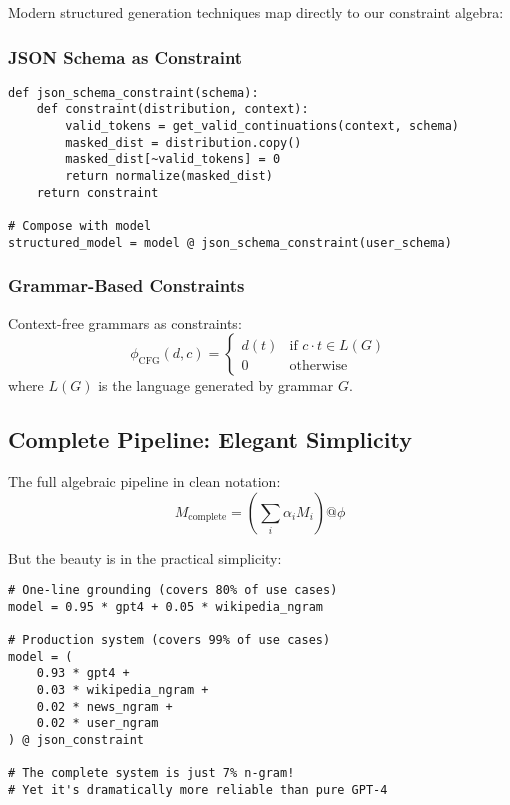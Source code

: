 \documentclass{article}
\theoremstyle{definition}
\begin{document}
Modern structured generation techniques map directly to our constraint algebra:

\subsubsection{JSON Schema as Constraint}

\begin{lstlisting}
def json_schema_constraint(schema):
    def constraint(distribution, context):
        valid_tokens = get_valid_continuations(context, schema)
        masked_dist = distribution.copy()
        masked_dist[~valid_tokens] = 0
        return normalize(masked_dist)
    return constraint

# Compose with model
structured_model = model @ json_schema_constraint(user_schema)
\end{lstlisting}

\subsubsection{Grammar-Based Constraints}

Context-free grammars as constraints:
\begin{equation}
\phi_{\text{CFG}}(d, c) = \begin{cases}
d(t) & \text{if } c \cdot t \in L(G) \\
0 & \text{otherwise}
\end{cases}
\end{equation}
where $L(G)$ is the language generated by grammar $G$.

\subsection{Complete Pipeline: Elegant Simplicity}

The full algebraic pipeline in clean notation:
\begin{equation}
M_{\text{complete}} = \left(\sum_{i} \alpha_i M_i\right) @ \phi
\end{equation}

But the beauty is in the practical simplicity:
\begin{lstlisting}
# One-line grounding (covers 80% of use cases)
model = 0.95 * gpt4 + 0.05 * wikipedia_ngram

# Production system (covers 99% of use cases)
model = (
    0.93 * gpt4 +
    0.03 * wikipedia_ngram +
    0.02 * news_ngram +
    0.02 * user_ngram
) @ json_constraint

# The complete system is just 7% n-gram!
# Yet it's dramatically more reliable than pure GPT-4
\end{lstlisting}
\end{document}

